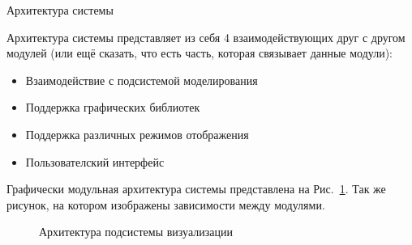 \documentclass[a4paper,12pt]{extarticle}
\begin{document}
\begin{section}{Архитектура системы}

Архитектура системы представляет из себя 4 взаимодействующих друг с другом модулей (или ещё сказать, что есть часть, которая связывает данные модули):
\begin{itemize}
    \item Взаимодействие с подсистемой моделирования
    \item Поддержка графических библиотек
    \item Поддержка различных режимов отображения
    \item Пользователский интерфейс
\end{itemize}
Графически модульная архитектура системы представлена на Рис.~\ref{ris:architecture-all}. Так же рисунок, на котором изображены зависимости между модулями.

\begin{figure}[h]
    \caption{Архитектура подсистемы визуализации}
    \label{ris:architecture-all}
\end{figure}


\end{section}
\end{document}
